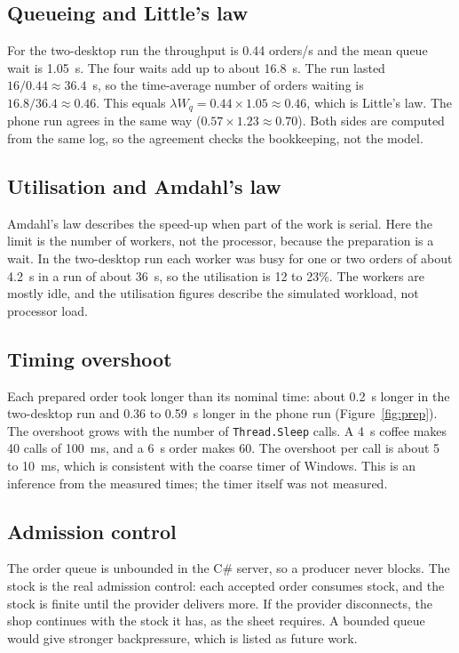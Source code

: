 \documentclass[12pt,a4paper]{article}
\begin{document}
\subsection{Queueing and Little's law}

For the two-desktop run the throughput is 0.44 orders/s and the mean queue wait is
1.05~s. The four waits add up to about 16.8~s. The run lasted $16/0.44 \approx 36.4$~s,
so the time-average number of orders waiting is $16.8/36.4 \approx 0.46$. This equals
$\lambda W_q = 0.44 \times 1.05 \approx 0.46$, which is Little's law. The phone run
agrees in the same way ($0.57 \times 1.23 \approx 0.70$). Both sides are computed from
the same log, so the agreement checks the bookkeeping, not the model.

\subsection{Utilisation and Amdahl's law}

Amdahl's law describes the speed-up when part of the work is serial. Here
the limit is the number of workers, not the processor, because the preparation is a
wait. In the two-desktop run each worker was busy for one or two orders of about 4.2~s
in a run of about 36~s, so the utilisation is 12 to 23\%. The workers are mostly idle,
and the utilisation figures describe the simulated workload, not processor load.

\subsection{Timing overshoot}

Each prepared order took longer than its nominal time: about 0.2~s longer in the
two-desktop run and 0.36 to 0.59~s longer in the phone run (Figure~\ref{fig:prep}). The
overshoot grows with the number of \texttt{Thread.Sleep} calls. A 4~s coffee makes 40 calls
of 100~ms, and a 6~s order makes 60. The overshoot per call is about 5 to 10~ms, which is
consistent with the coarse timer of Windows. This is an inference from the measured times;
the timer itself was not measured.

\subsection{Admission control}

The order queue is unbounded in the C\# server, so a producer never blocks. The stock is
the real admission control: each accepted order consumes stock, and the stock is finite
until the provider delivers more. If the provider disconnects, the shop continues with the
stock it has, as the sheet requires. A bounded queue would give stronger backpressure, which
is listed as future work.
\end{document}
